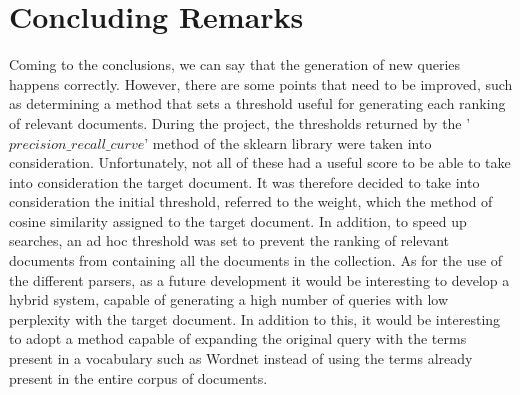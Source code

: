 \section*{Concluding Remarks}
Coming to the conclusions, we can say that the generation of new queries 
happens correctly. However, there are some points that need to be improved, 
such as determining a method that sets a threshold useful for generating each 
ranking of relevant documents. During the project, the thresholds returned 
by the '$precision\_recall\_curve$' method of the sklearn library were taken into 
consideration. Unfortunately, not all of these had a useful score to be able 
to take into consideration the target document. It was therefore decided to 
take into consideration the initial threshold, referred to the weight, which the 
method of cosine similarity assigned to the target document. In addition, to 
speed up searches, an ad hoc threshold was set to prevent the ranking of 
relevant documents from containing all the documents in the collection. As 
for the use of the different parsers, as a future development it would be 
interesting to develop a hybrid system, capable of generating a high number 
of queries with low perplexity with the target document. In addition to this, 
it would be interesting to adopt a method capable of expanding the original 
query with the terms present in a vocabulary such as Wordnet instead of 
using the terms already present in the entire corpus of documents.